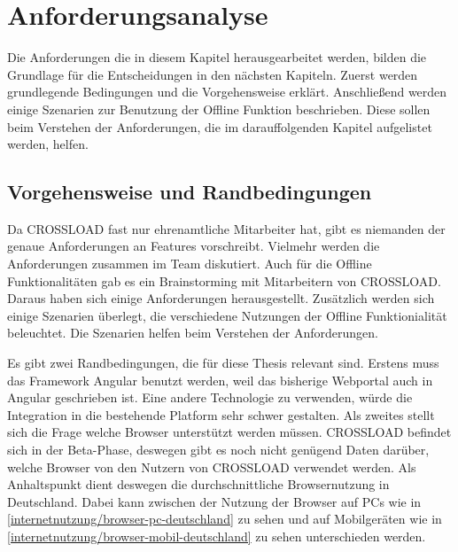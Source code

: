 \chapter{Anforderungsanalyse}
\label{Kap3}
Die Anforderungen die in diesem Kapitel herausgearbeitet werden, bilden die Grundlage für die Entscheidungen in den nächsten Kapiteln. Zuerst werden grundlegende Bedingungen und die Vorgehensweise erklärt. Anschließend werden einige Szenarien zur Benutzung der Offline Funktion beschrieben. Diese sollen beim Verstehen der Anforderungen, die im darauffolgenden Kapitel aufgelistet werden, helfen.

\section{Vorgehensweise und Randbedingungen}
Da CROSSLOAD fast nur ehrenamtliche Mitarbeiter hat, gibt es niemanden der genaue Anforderungen an Features vorschreibt. Vielmehr werden die Anforderungen zusammen im Team diskutiert. Auch für die Offline Funktionalitäten gab es ein Brainstorming mit Mitarbeitern von CROSSLOAD. Daraus haben sich einige Anforderungen herausgestellt. Zusätzlich werden sich einige Szenarien überlegt, die verschiedene Nutzungen der Offline Funktionialität beleuchtet. Die Szenarien helfen beim Verstehen der Anforderungen.

Es gibt zwei Randbedingungen, die für diese Thesis relevant sind. Erstens muss das Framework Angular benutzt werden, weil das bisherige Webportal auch in Angular geschrieben ist. Eine andere Technologie zu verwenden, würde die Integration in die bestehende Platform sehr schwer gestalten. Als zweites stellt sich die Frage welche Browser unterstützt werden müssen. CROSSLOAD befindet sich in der Beta-Phase, deswegen gibt es noch nicht genügend Daten darüber, welche Browser von den Nutzern von CROSSLOAD verwendet werden. Als Anhaltspunkt dient deswegen die durchschnittliche Browsernutzung in Deutschland. Dabei kann zwischen der Nutzung der Browser auf PCs wie in \autoref{internetnutzung/browser-pc-deutschland} zu sehen und auf Mobilgeräten wie in \autoref{internetnutzung/browser-mobil-deutschland} zu sehen unterschieden werden.



